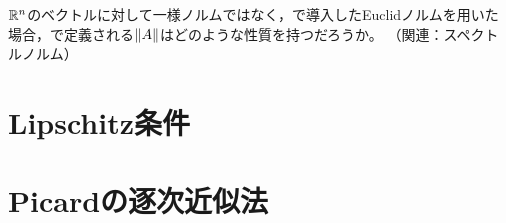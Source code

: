 \documentclass[b5paper,oneside,openany]{ltjsbook} %
\begin{document}
\begin{prob}
    $\mathbb{R}^n$のベクトルに対して一様ノルムではなく，で導入したEuclidノルムを用いた場合，で定義される$\norm{A}$はどのような性質を持つだろうか。
    （関連：スペクトルノルム）
\end{prob}


\section{Lipschitz条件}


\section{Picardの逐次近似法}
\end{document}
